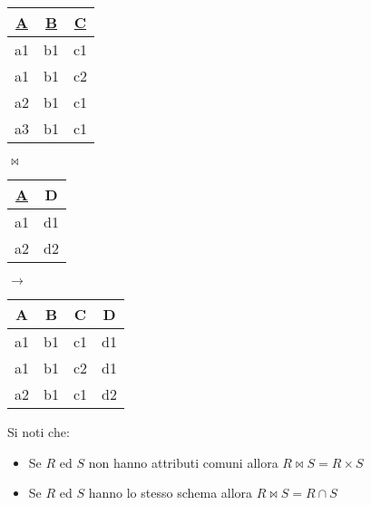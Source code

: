 \begin{table}[!h]
	\centering
	\begin{tabular}{|c|c|c|}
		\hline
		\textbf{\underline{A}} & \textbf{\underline{B}} & \textbf{\underline{C}} \\
		\hline
		a1 & b1 & c1 \\
		\hline
		a1 & b1 & c2 \\
		\hline
		a2 & b1 & c1 \\
		\hline
		a3 & b1 & c1 \\
		\hline
	\end{tabular}
	\hspace{10pt} $\Join$ \hspace{10pt}
	\begin{tabular}{|c|c|}
		\hline
		\textbf{\underline{A}} & \textbf{D} \\
		\hline
		a1 & d1 \\
		\hline
		a2 & d2 \\
		\hline
	\end{tabular}
	\hspace{10pt} $\longrightarrow$ \hspace{10pt}
	\begin{tabular}{|c|c|c|c|}
		\hline
		\textbf{A} & \textbf{B} & \textbf{C} & \textbf{D} \\
		\hline
		a1 & b1 & c1 & d1\\
		\hline
		a1 & b1 & c2 & d1 \\
		\hline
		a2 & b1 & c1 & d2 \\
		\hline
	\end{tabular}
\end{table}

\begin{note}
	Si noti che:
	\begin{itemize}
		\item Se $R$ ed $S$ non hanno attributi comuni allora $R \Join S = R \times S$
		\item Se $R$ ed $S$ hanno lo stesso schema allora $R \Join S = R \cap S$
	\end{itemize}
\end{note}

